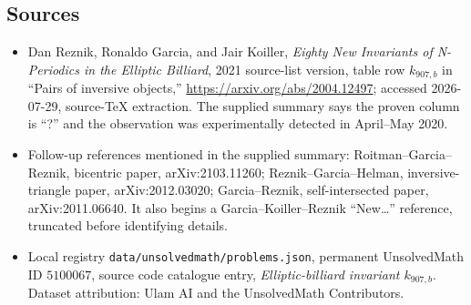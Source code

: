 \documentclass[11pt]{article}
\begin{document}
\subsection{Sources}
\begin{itemize}
\item Dan Reznik, Ronaldo Garcia, and Jair Koiller, \emph{Eighty New Invariants of N-Periodics in the Elliptic Billiard}, 2021 source-list version, table row $k_{907,b}$ in ``Pairs of inversive objects,'' \url{https://arxiv.org/abs/2004.12497}; accessed 2026-07-29, source-TeX extraction. The supplied summary says the proven column is ``?'' and the observation was experimentally detected in April--May 2020.
\item Follow-up references mentioned in the supplied summary: Roitman--Garcia--Reznik, bicentric paper, arXiv:2103.11260; Reznik--Garcia--Helman, inversive-triangle paper, arXiv:2012.03020; Garcia--Reznik, self-intersected paper, arXiv:2011.06640. It also begins a Garcia--Koiller--Reznik ``New\ldots'' reference, truncated before identifying details.
\item Local registry \texttt{data/unsolvedmath/problems.json}, permanent UnsolvedMath ID $5100067$, source code catalogue entry, \emph{Elliptic-billiard invariant $k_{907,b}$}. Dataset attribution: Ulam AI and the UnsolvedMath Contributors.
\end{itemize}
\end{document}
